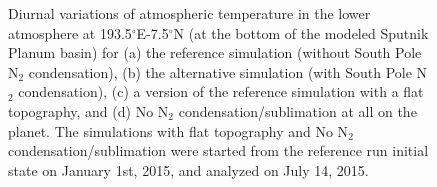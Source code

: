 \begin{figure}
\begin{center}
\begin{tabular}[h]{cc}
\end{tabular}
    \caption{
\label{fg:diuT}
Diurnal variations of atmospheric temperature in the lower atmosphere at 
193.5$^\circ$E-7.5$^\circ$N (at the bottom of the modeled Sputnik Planum basin) 
for (a) the reference simulation
(without South Pole N$_2$ condensation), (b) the alternative simulation (with South Pole N$_2$
condensation), (c) a version of the reference simulation with a flat topography, and
(d) No N$_2$ condensation/sublimation at all on the planet.
The simulations with flat topography and No N$_2$ condensation/sublimation were 
started from the reference run initial state on January 1st, 2015,
and analyzed on July 14, 2015.
}
  \end{center}
\end{figure}

